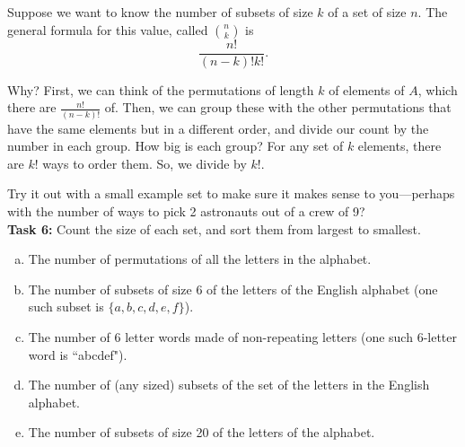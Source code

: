 \documentclass[12pt,letterpaper]{article}
\newif\ifsol
\newcommand{\solu}[2]{ \begin{mdframed} \ifsol #2 \else \vspace{#1} \fi \end{mdframed} }
\begin{document}
	Suppose we want to know the number of subsets of size $k$ of a set of size $n$. The general formula for this value, called $\binom{n}{k}$ is $$\frac{n!}{(n-k)!k!}.$$
	
	Why? First, we can think of the permutations of length $k$ of elements of $A$, which there are $\frac{n!}{(n-k)!}$ of. Then, we can group these with the other permutations that have the same elements but in a different order, and divide our count by the number in each group. How big is each group? For any set of $k$ elements, there are $k!$ ways to order them. So, we divide by $k!$.
	
	Try it out with a small example set to make sure it makes sense to you---perhaps with the number of ways to pick 2 astronauts out of a crew of 9?\\
	
	\textbf{Task 6: }Count the size of each set, and sort them from largest to smallest. 
	\begin{enumerate}[a.]
	    \item The number of permutations of all the letters in the alphabet.
	    \item The number of subsets of size 6 of the letters of the English alphabet (one such subset is $\{a, b, c, d, e, f\}$).
	    \item The number of 6 letter words made of non-repeating letters (one such 6-letter word is ``abcdef").
	    \item The number of (any sized) subsets of the set of the letters in the English alphabet. 
	    \item The number of subsets of size 20 of the letters of the alphabet. 
	\end{enumerate}
	\solu{8cm}{
    \begin{enumerate}
        \item $26!$
        \item $\binom{26}{6}=\frac{26!}{20!*6!}$
        \item $\frac{26!}{20!}$
        \item $2^{26}$
        \item $\binom{26}{20}=\frac{26!}{20!*6!}$
    \end{enumerate}	
	1, 3, 4, 2 = 5}
\end{document}
